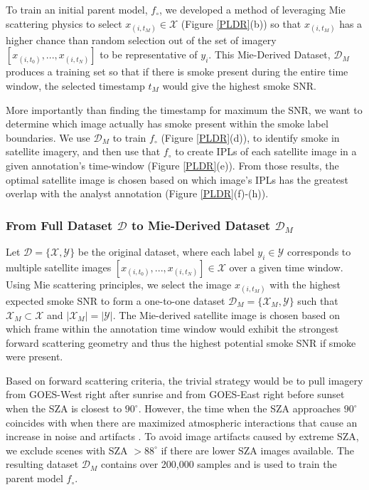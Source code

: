 \documentclass{article}
\begin{document}
To train an initial parent model, \(f_{\circ}\), we developed a method of leveraging Mie scattering physics to select \(x_{(i,t_M)} \in \mathcal{X}\) (Figure \ref{PLDR}(b)) so that \(x_{(i,t_M)}\) has a higher chance than random selection out of the set of imagery \([x_{(i,t_0)},...,x_{(i,t_N)}]\) to be representative of \(y_i\). This Mie-Derived Dataset, \(\mathcal{D}_M\) produces a training set so that if there is smoke present during the entire time window, the selected timestamp \(t_M\) would give the highest smoke SNR. 

More importantly than finding the timestamp for maximum the SNR, we want to determine which image actually has smoke present within the smoke label boundaries. We use \(\mathcal{D}_M\) to train \(f_{\circ}\) (Figure \ref{PLDR}(d)), to identify smoke in satellite imagery, and then use that \(f_{\circ}\) to create IPLs of each satellite image in a given annotation's time-window (Figure \ref{PLDR}(e)). From those results, the optimal satellite image is chosen based on which image's IPLs has the greatest overlap with the analyst annotation (Figure \ref{PLDR}(f)-(h)).


\subsubsection{From Full Dataset \(\mathcal{D}\) to Mie-Derived Dataset \(\mathcal{D}_M\)}



Let \(\mathcal{D} = \{\mathcal{X}, \mathcal{Y}\}\) be the original dataset, where each label \(y_i \in \mathcal{Y}\) corresponds to multiple satellite images \([x_{(i,t_0)},...,x_{(i,t_N)}] \in \mathcal{X}\) over a given time window. Using Mie scattering principles, we select the image \(x_{(i,t_M)}\) with the highest expected smoke SNR to form a one-to-one dataset \(\mathcal{D}_M = \{\mathcal{X}_M, \mathcal{Y}\}\) such that \(\mathcal{X}_M \subset \mathcal{X}\) and \(|\mathcal{X}_M| = |\mathcal{Y}|\). The Mie-derived satellite image is chosen based on which frame within the annotation time window would exhibit the strongest forward scattering geometry and thus the highest potential smoke SNR if smoke were present. 

Based on forward scattering criteria, the trivial strategy would be to pull imagery from GOES-West right after sunrise and from GOES-East right before sunset when the SZA is closest to \(90^{\circ}\). However, the time when the SZA approaches \(90^{\circ}\) coincides with when there are maximized atmospheric interactions that cause an increase in noise and artifacts \cite{zen_angle}. To avoid image artifacts caused by extreme SZA, we exclude scenes with SZA \(>88^\circ\) if there are lower SZA images available. The resulting dataset \(\mathcal{D}_M\) contains over 200,000 samples and is used to train the parent model \(f_{\circ}\).
\end{document}
